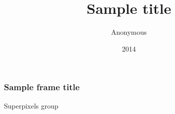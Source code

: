 \documentclass{beamer}
\title{Sample title}
\author{Anonymous}
\institute{ShareLaTeX}
\date{2014}
\begin{document}
 
\frame{\titlepage}
 
\begin{frame}
\frametitle{Sample frame title}
Superpixels group 
\end{frame}
 
\end{document}
